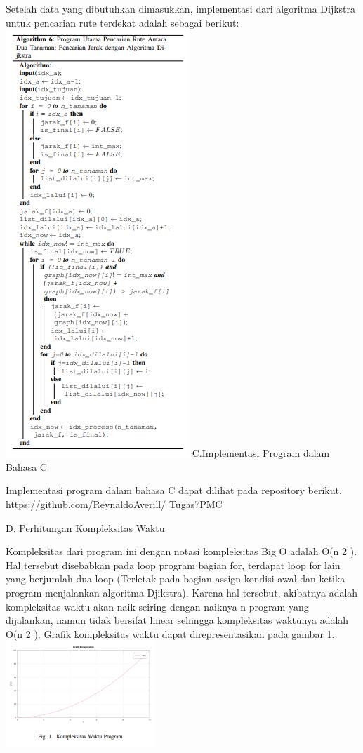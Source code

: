 \documentclass[conference]{IEEEtran}
\begin{document}
Setelah data yang dibutuhkan dimasukkan, implementasi
dari algoritma Dijkstra untuk pencarian rute terdekat adalah
sebagai berikut:
\includegraphics[scale=0.75]{tugas0528.jpg}\vspace{0.5cm}
C.Implementasi Program dalam Bahasa C\vspace{0.5cm}

Implementasi program dalam bahasa C dapat dilihat
pada repository berikut. https://github.com/ReynaldoAverill/
Tugas7PMC

D. Perhitungan Kompleksitas Waktu\vspace{0.5cm}

Kompleksitas dari program ini dengan notasi kompleksitas
Big O adalah O(n
2
). Hal tersebut disebabkan pada loop
program bagian for, terdapat loop for lain yang berjumlah
dua loop (Terletak pada bagian assign kondisi awal dan ketika
program menjalankan algoritma Djikstra). Karena hal tersebut,
akibatnya adalah kompleksitas waktu akan naik seiring dengan
naiknya n program yang dijalankan, namun tidak bersifat
linear sehingga kompleksitas waktunya adalah O(n
2
). Grafik
kompleksitas waktu dapat direpresentasikan pada gambar 1.
\includegraphics[scale=0.75]{tugas0529.jpg}\vspace{0.5cm}
\end{document}
